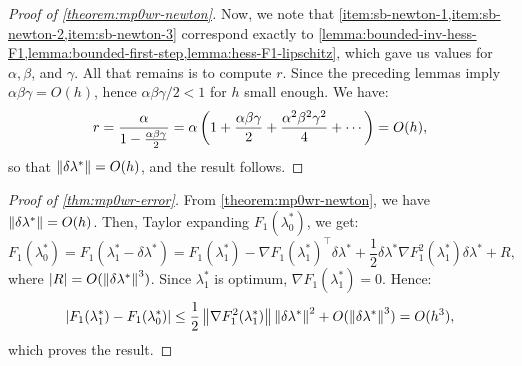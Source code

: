 \documentclass[eikonal.tex]{subfiles}
\begin{document}
\begin{proof}[Proof of \cref{theorem:mp0wr-newton}]
  Now, we note that
  \cref{item:sb-newton-1,item:sb-newton-2,item:sb-newton-3} correspond
  exactly to
  \cref{lemma:bounded-inv-hess-F1,lemma:bounded-first-step,lemma:hess-F1-lipschitz},
  which gave us values for $\alpha, \beta$, and $\gamma$. All that
  remains is to compute $r$. Since the preceding lemmas imply
  $\alpha\beta\gamma = O(h)$, hence $\alpha\beta\gamma/2 < 1$ for $h$
  small enough. We have:
  \begin{equation}
    r = \frac{\alpha}{1 - \frac{\alpha\beta\gamma}{2}} = \alpha \left(1 + \frac{\alpha\beta\gamma}{2} + \frac{\alpha^2\beta^2\gamma^2}{4} + \cdots\right) = O(h),
  \end{equation}
  so that $\left\|\delta\lambda^*\right\| = O(h)$, and the result follows.
\end{proof}

\begin{proof}[Proof of \cref{thm:mp0wr-error}]
  From \cref{theorem:mp0wr-newton}, we have
  $\left\|\delta\lambda^*\right\| = O(h)$. Then, Taylor expanding
  $F_1(\lambda_0^*)$, we get:
  \begin{equation*}
    F_1(\lambda_0^*)
    = F_1(\lambda_1^* - \delta \lambda^*) = F_1(\lambda_1^*) - \nabla F_1(\lambda_1^*)^\top \delta\lambda^* + \frac{1}{2} \delta\lambda^* \nabla F_1^2(\lambda_1^*) \delta\lambda^* + R,
  \end{equation*}
  where $\left|R\right| = O(\left\|\delta\lambda^*\right\|^3)$. Since $\lambda_1^*$
  is optimum, $\nabla F_1(\lambda_1^*) = 0$. Hence:
  \begin{equation*}
    \left|F_1(\lambda_1^*) - F_1(\lambda_0^*)\right| \leq \frac{1}{2} \left\|\nabla F_1^2(\lambda_1^*)\right\| \left\|\delta\lambda^*\right\|^2 + O(\left\|\delta\lambda^*\right\|^3) = O(h^3),
  \end{equation*}
  which proves the result.
\end{proof}
\end{document}
